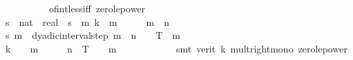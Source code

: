 \begin{isabellebody}
\ \ \ \ \ \ \ \ \ \ of{\isacharunderscore}{\kern0pt}int{\isacharunderscore}{\kern0pt}{}{\isacharunderscore}{\kern0pt}less{\isacharunderscore}{\kern0pt}iff\ zero{\isacharunderscore}{\kern0pt}le{\isacharunderscore}{\kern0pt}power{\isacharparenright}{\kern0pt}\isanewline
\ \ \ \ \isamarkupfalse%
\ s\ {\isacharcolon}{\kern0pt}{\isacharcolon}{\kern0pt}\ {\isachardoublequoteopen}nat\ {\isasymRightarrow}\ real{\isachardoublequoteclose}\ \ {\isachardoublequoteopen}s\ {\isasymequiv}\ {\isasymlambda}m{\isachardot}{\kern0pt}\ {\isacharparenleft}{\kern0pt}k\ {\isacharasterisk}{\kern0pt}\ {}{\isacharcircum}{\kern0pt}{\isacharparenleft}{\kern0pt}m{\isacharplus}{\kern0pt}{}{\isacharparenright}{\kern0pt}\ {\isacharminus}{\kern0pt}\ {}{\isacharparenright}{\kern0pt}\ {\isacharslash}{\kern0pt}\ {}\ {\isacharcircum}{\kern0pt}\ {\isacharparenleft}{\kern0pt}m\ {\isacharplus}{\kern0pt}\ n\ {\isacharplus}{\kern0pt}\ {}{\isacharparenright}{\kern0pt}{\isachardoublequoteclose}\isanewline
\ \ \ \ \isamarkupfalse%
\ {\isachardoublequoteopen}s\ m\ {\isasymin}\ dyadic{\isacharunderscore}{\kern0pt}interval{\isacharunderscore}{\kern0pt}step\ {\isacharparenleft}{\kern0pt}m\ {\isacharplus}{\kern0pt}\ n\ {\isacharplus}{\kern0pt}\ {}{\isacharparenright}{\kern0pt}\ {}\ T{\isachardoublequoteclose}\ \ m\isanewline
\ \ \ \ \isamarkupfalse%
\ {\isacharminus}{\kern0pt}\isanewline
\ \ \ \ \ \ \isamarkupfalse%
\ {\isachardoublequoteopen}k\ {\isacharasterisk}{\kern0pt}\ {\isacharparenleft}{\kern0pt}{}\ {\isacharcircum}{\kern0pt}\ {\isacharparenleft}{\kern0pt}m{\isacharplus}{\kern0pt}{}{\isacharparenright}{\kern0pt}{\isacharparenright}{\kern0pt}\ {\isacharminus}{\kern0pt}\ {}\ {\isasymle}\ {\isasymlfloor}{}\ {\isacharcircum}{\kern0pt}\ n\ {\isacharasterisk}{\kern0pt}\ T{\isasymrfloor}\ {\isacharasterisk}{\kern0pt}\ {\isacharparenleft}{\kern0pt}{}\ {\isacharcircum}{\kern0pt}\ {\isacharparenleft}{\kern0pt}m{\isacharplus}{\kern0pt}{}{\isacharparenright}{\kern0pt}{\isacharparenright}{\kern0pt}\ {\isacharminus}{\kern0pt}\ {}{\isachardoublequoteclose}\isanewline
\ \ \ \ \ \ \ \ \isamarkupfalse%
\ {\isacharparenleft}{\kern0pt}smt\ {\isacharparenleft}{\kern0pt}verit{\isacharparenright}{\kern0pt}\ k{\isacharparenleft}{\kern0pt}{}{\isacharparenright}{\kern0pt}\ mult{\isacharunderscore}{\kern0pt}right{\isacharunderscore}{\kern0pt}mono\ zero{\isacharunderscore}{\kern0pt}le{\isacharunderscore}{\kern0pt}power{\isacharparenright}{\kern0pt}\isanewline

\end{isabellebody}
